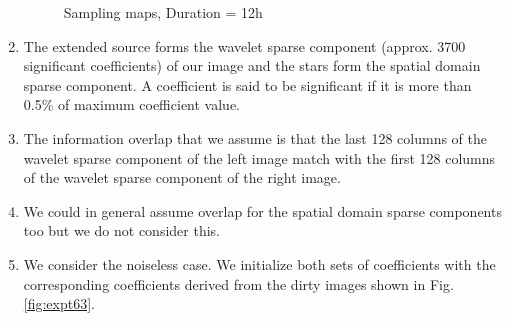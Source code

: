 \begin{enumerate}
\begin{figure}[h!]
\hspace{0.4in}
		\hspace{0.2in}
\caption [Sampling maps, Duration = 12h]{Sampling maps, Duration = 12h}
\label{fig:expt62}
\end{figure}

\item The extended source forms the wavelet sparse component (approx. 3700 significant coefficients) of our image and the stars form the spatial domain sparse component. A coefficient is said to be significant if it is more than 0.5\% of maximum coefficient value.

\item The information overlap that we assume is that the last 128 columns of the wavelet sparse component of the left image match with the first 128 columns of the wavelet sparse component of the right image.
\item We could in general assume overlap for the spatial domain sparse components too but we do not consider this.
\item We consider the noiseless case. We initialize both sets of coefficients with the corresponding coefficients derived from the dirty images shown in Fig. \ref{fig:expt63}.


\end{enumerate}
